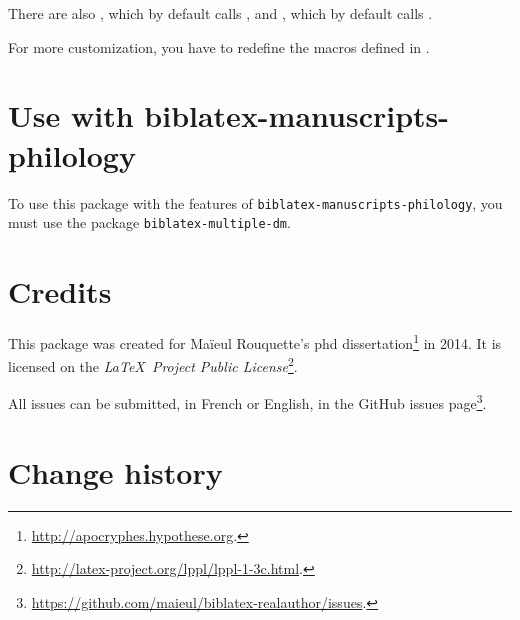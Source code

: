 \documentclass{ltxdockit}[2011/03/25]
\begin{document}
There are also , which by default calls , and , which by default calls .

For more customization, you have to redefine the macros defined in .




\section{Use with biblatex-manuscripts-philology}

To use this package with the features of \verb+biblatex-manuscripts-philology+, you must use the package \verb+biblatex-multiple-dm+.

\section{Credits}

This package was created for Maïeul Rouquette's phd dissertation\footnote{\url{http://apocryphes.hypothese.org}.} in 2014. It is licensed on the \emph{\LaTeX\ Project Public License}\footnote{\url{http://latex-project.org/lppl/lppl-1-3c.html}.}.


All issues can be submitted, in French or English, in the GitHub issues page\footnote{\url{https://github.com/maieul/biblatex-realauthor/issues}.}.

\section{Change history}
\end{document}
